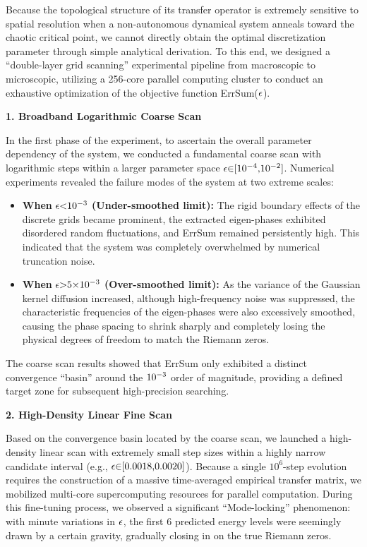 \documentclass[fleqn,10pt]{wlscirep}
\begin{document}
Because the topological structure of its transfer operator is extremely
sensitive to spatial resolution when a non-autonomous dynamical system
anneals toward the chaotic critical point, we cannot directly obtain the
optimal discretization parameter through simple analytical derivation.
To this end, we designed a ``double-layer grid scanning'' experimental
pipeline from macroscopic to microscopic, utilizing a 256-core parallel
computing cluster to conduct an exhaustive optimization of the objective
function ErrSum(\(\text{\ensuremath{\epsilon}}\)).

\textbf{1. Broadband Logarithmic Coarse Scan}

In the first phase of the experiment, to ascertain the overall parameter
dependency of the system, we conducted a fundamental coarse scan with
logarithmic steps within a larger parameter space
\(\text{\ensuremath{\epsilon}\ensuremath{\in}[}\text{10}^{\text{\ensuremath{-}4}}\text{,}\text{10}^{\text{\ensuremath{-}2}}\text{]}\).
Numerical experiments revealed the failure modes of the system at two
extreme scales:

\begin{itemize}
\item
  \textbf{When} \(\text{\ensuremath{\epsilon}<}\text{10}^{\text{\ensuremath{-}3}}\)
  \textbf{(Under-smoothed limit):} The rigid boundary effects of the
  discrete grids became prominent, the extracted eigen-phases exhibited
  disordered random fluctuations, and ErrSum remained persistently high.
  This indicated that the system was completely overwhelmed by numerical
  truncation noise.
\item
  \textbf{When} \(\text{\ensuremath{\epsilon}>5\ensuremath{\times}}\text{10}^{\text{\ensuremath{-}3}}\)
  \textbf{(Over-smoothed limit):} As the variance of the Gaussian kernel
  diffusion increased, although high-frequency noise was suppressed, the
  characteristic frequencies of the eigen-phases were also excessively
  smoothed, causing the phase spacing to shrink sharply and completely
  losing the physical degrees of freedom to match the Riemann zeros.
\end{itemize}

The coarse scan results showed that ErrSum only exhibited a distinct
convergence ``basin'' around the \(\text{10}^{\text{\ensuremath{-}3}}\) order of
magnitude, providing a defined target zone for subsequent high-precision
searching.

\textbf{2. High-Density Linear Fine Scan}

Based on the convergence basin located by the coarse scan, we launched a
high-density linear scan with extremely small step sizes within a highly
narrow candidate interval (e.g., \(\text{\ensuremath{\epsilon}\ensuremath{\in}[0.0018,0.0020]}\)). Because
a single \(\text{10}^{\text{6}}\)-step evolution requires the
construction of a massive time-averaged empirical transfer matrix, we
mobilized multi-core supercomputing resources for parallel computation.
During this fine-tuning process, we observed a significant
``Mode-locking'' phenomenon: with minute variations in \(\text{\ensuremath{\epsilon}}\), the
first 6 predicted energy levels were seemingly drawn by a certain
gravity, gradually closing in on the true Riemann zeros.
\end{document}
